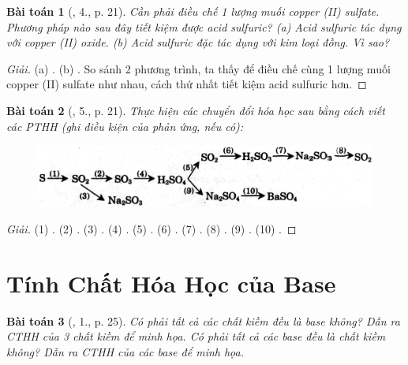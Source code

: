 \documentclass{article}
\newtheorem{baitoan}{Bài toán}
\begin{document}
\begin{baitoan}[\cite{SGK_Hoa_Hoc_9}, 4., p. 21]
	Cần phải điều chế 1 lượng muối copper {\rm(II)} sulfate. Phương pháp nào sau đây tiết kiệm được acid sulfuric? (a) Acid sulfuric tác dụng với copper {\rm(II)} oxide. (b) Acid sulfuric đặc tác dụng với kim loại đồng. Vì sao?
\end{baitoan}

\begin{proof}[Giải]
	(a) . (b) . So sánh 2 phương trình, ta thấy để điều chế cùng 1 lượng muối copper (II) sulfate như nhau, cách thứ nhất tiết kiệm acid sulfuric hơn.
\end{proof}

\begin{baitoan}[\cite{SGK_Hoa_Hoc_9}, 5., p. 21]
	Thực hiện các chuyển đổi hóa học sau bằng cách viết các {\rm PTHH} (ghi điều kiện của phản ứng, nếu có):
	\begin{figure}[H]
		\centering
		\includegraphics[scale=.8]{S1}
	\end{figure}
\end{baitoan}

\begin{proof}[Giải]
	(1) . (2) . (3) . (4) . (5) . (6) . (7) . (8) . (9) . (10) .
\end{proof}


\section{Tính Chất Hóa Học của Base}

\begin{baitoan}[\cite{SGK_Hoa_Hoc_9}, 1., p. 25]
	Có phải tất cả các chất kiềm đều là base không? Dẫn ra CTHH của 3 chất kiềm để minh họa. Có phải tất cả các base đều là chất kiềm không? Dẫn ra {\rm CTHH} của các base để minh họa.
\end{baitoan}
\end{document}
